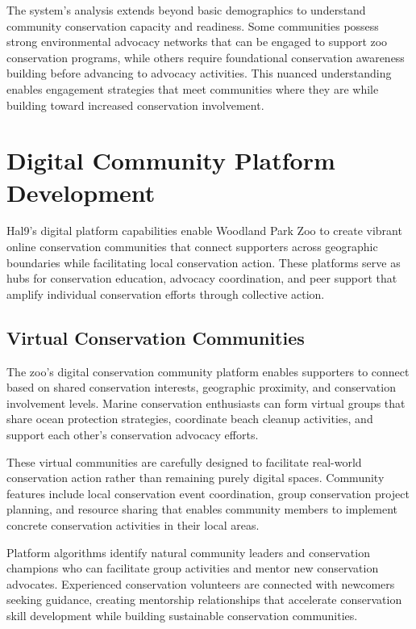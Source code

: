 \documentclass[
  Letterpaper,
]{scrbook}
\begin{document}
The system's analysis extends beyond basic demographics to understand
community conservation capacity and readiness. Some communities possess
strong environmental advocacy networks that can be engaged to support
zoo conservation programs, while others require foundational
conservation awareness building before advancing to advocacy activities.
This nuanced understanding enables engagement strategies that meet
communities where they are while building toward increased conservation
involvement.

\section{Digital Community Platform
Development}\label{digital-community-platform-development}

Hal9's digital platform capabilities enable Woodland Park Zoo to create
vibrant online conservation communities that connect supporters across
geographic boundaries while facilitating local conservation action.
These platforms serve as hubs for conservation education, advocacy
coordination, and peer support that amplify individual conservation
efforts through collective action.

\subsection{Virtual Conservation
Communities}\label{virtual-conservation-communities}

The zoo's digital conservation community platform enables supporters to
connect based on shared conservation interests, geographic proximity,
and conservation involvement levels. Marine conservation enthusiasts can
form virtual groups that share ocean protection strategies, coordinate
beach cleanup activities, and support each other's conservation advocacy
efforts.

These virtual communities are carefully designed to facilitate
real-world conservation action rather than remaining purely digital
spaces. Community features include local conservation event
coordination, group conservation project planning, and resource sharing
that enables community members to implement concrete conservation
activities in their local areas.

Platform algorithms identify natural community leaders and conservation
champions who can facilitate group activities and mentor new
conservation advocates. Experienced conservation volunteers are
connected with newcomers seeking guidance, creating mentorship
relationships that accelerate conservation skill development while
building sustainable conservation communities.
\end{document}
